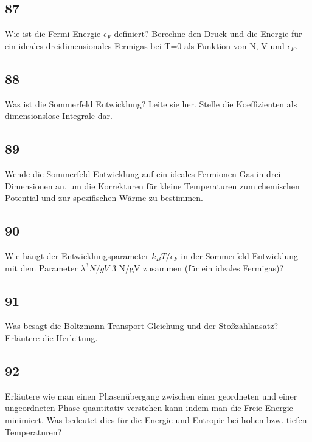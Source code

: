 \documentclass[12pt,a4paper]{report}
\newenvironment{myfrag}{\begin{it}}{\end{it}\vspace{3mm}\par}
\numberwithin{equation}{section}
\begin{document}
\subsection{87}
\begin{myfrag}
Wie ist die Fermi Energie $\epsilon _F$ definiert? Berechne den Druck und die Energie
für ein ideales dreidimensionales Fermigas bei T=0 als Funktion von N, V
und $\epsilon _F$.
\end{myfrag}
\subsection{88}
\begin{myfrag}
Was ist die Sommerfeld Entwicklung? Leite sie her. Stelle die Koeffizienten als
dimensionslose Integrale dar.
\end{myfrag}
\subsection{89}
\begin{myfrag}
Wende die Sommerfeld Entwicklung auf ein ideales Fermionen Gas in drei Dimensionen
an, um die Korrekturen für kleine Temperaturen zum chemischen Potential und zur
spezifischen Wärme zu bestimmen.
\end{myfrag}
\subsection{90}
\begin{myfrag}
Wie hängt der Entwicklungsparameter $k_B T/\epsilon_F$ in der Sommerfeld Entwicklung mit dem
Parameter $\lambda^3 N/gV$ 3 N/gV zusammen (für ein ideales Fermigas)?
\end{myfrag}
\subsection{91}
\begin{myfrag}
Was besagt die Boltzmann Transport Gleichung und der Stoßzahlansatz? Erläutere die
Herleitung.
\end{myfrag}
\subsection{92}
\begin{myfrag}
Erläutere wie man einen Phasenübergang zwischen einer geordneten und einer
ungeordneten Phase quantitativ verstehen kann indem man die Freie Energie minimiert.
Was bedeutet dies für die Energie und Entropie bei hohen bzw. tiefen Temperaturen?
\end{myfrag}
\end{document}

